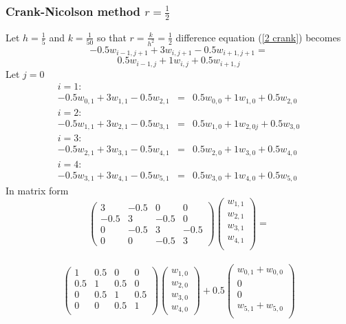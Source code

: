 \begin{example}
\subsubsection{Crank-Nicolson method $r=\frac{1}{2}$}
Let $h=\frac{1}{5}$ and $k=\frac{1}{50}$ so that $r=\frac{k}{h^2}=\frac{1}{2}$
difference equation (\ref{2 crank}) becomes
\[-0.5w_{i-1,j+1}+3w_{i,j+1}-0.5w_{i+1,j+1}=\]
\[
0.5w_{i-1,j}+1w_{i,j}+0.5w_{i+1,j} \]
Let $j=0$
\[\begin{array}{lcl}
i=1:&\\
-0.5w_{0,1}+3w_{1,1}-0.5w_{2,1}&=&0.5w_{0,0}+1w_{1,0}+0.5w_{2,0}\\
i=2:&\\
-0.5w_{1,1}+3w_{2,1}-0.5w_{3,1}&=&0.5w_{1,0}+1w_{2,0j}+0.5w_{3,0}\\
i=3:&\\
-0.5w_{2,1}+3w_{3,1}-0.5w_{4,1}&=&0.5w_{2,0}+1w_{3,0}+0.5w_{4,0}\\
i=4:&\\
-0.5w_{3,1}+3w_{4,1}-0.5w_{5,1}&=&0.5w_{3,0}+1w_{4,0}+0.5w_{5,0}
\end{array}\]
In matrix form
\[\left(\begin{array}{cccc}
3&-0.5&0&0\\
-0.5&3&-0.5&0\\
0&-0.5&3&-0.5\\
0&0&-0.5&3
\end{array}
\right)
\left(\begin{array}{c}
w_{1,1}\\
w_{2,1}\\
w_{3,1}\\
w_{4,1}\\
\end{array}
\right)=\]\
\[\left(\begin{array}{cccc}
1&0.5&0&0\\
0.5&1&0.5&0\\
0&0.5&1&0.5\\
0&0&0.5&1\\

\end{array}
\right)
\left(\begin{array}{c}
w_{1,0}\\
w_{2,0}\\
w_{3,0}\\
w_{4,0}
\end{array}
\right)+0.5
\left(\begin{array}{c}
w_{0,1}+w_{0,0}\\
0\\
0\\
w_{5,1}+w_{5,0}\\
\end{array}
\right)
\]	




\end{example}
